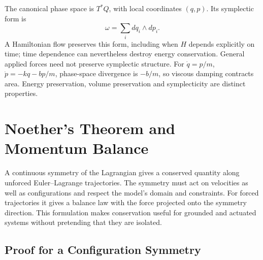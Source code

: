 The canonical phase space is $T^*Q$, with local coordinates $(q,p)$. Its symplectic form is
\begin{equation}
\omega=\sum_i dq_i\wedge dp_i.
\label{eq:symplectic_form}
\end{equation}
A Hamiltonian flow preserves this form, including when $H$ depends explicitly on time; time dependence can nevertheless destroy energy conservation. General applied forces need not preserve symplectic structure. For $\dot q=p/m$, $\dot p=-kq-bp/m$, phase-space divergence is $-b/m$, so viscous damping contracts area. Energy preservation, volume preservation and symplecticity are distinct properties.

\section{Noether's Theorem and Momentum Balance}
\label{sec:noether}

A continuous symmetry of the Lagrangian gives a conserved quantity along unforced Euler--Lagrange trajectories. The symmetry must act on velocities as well as configurations and respect the model's domain and constraints. For forced trajectories it gives a balance law with the force projected onto the symmetry direction. This formulation makes conservation useful for grounded and actuated systems without pretending that they are isolated.

\subsection{Proof for a Configuration Symmetry}
\label{sec:noether_proof}


